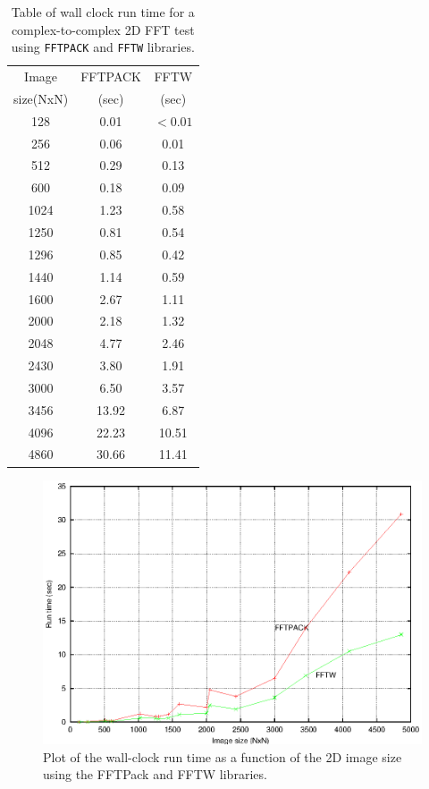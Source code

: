 \begin{table}[h!]
\begin{center}
\caption{\small Table of wall clock run time for a complex-to-complex 2D FFT
test using {\tt FFTPACK} and {\tt FFTW} libraries.}
\label{FFT_TAB}
\vskip 0.5cm
\begin{tabular}{|c|c|c|}
\hline
Image     & FFTPACK &  FFTW   \\
size(NxN) & (sec)   & (sec)   \\
\hline
128       & 0.01    & $<0.01$ \\
256       & 0.06    & 0.01    \\
512       & 0.29    & 0.13    \\
600       & 0.18    & 0.09    \\
1024      & 1.23    & 0.58    \\
1250      & 0.81    & 0.54    \\
1296      & 0.85    & 0.42    \\
1440      & 1.14    & 0.59    \\
1600      & 2.67    & 1.11    \\
2000      & 2.18    & 1.32    \\
2048      & 4.77    & 2.46    \\
2430      & 3.80    & 1.91    \\
3000      & 6.50    & 3.57    \\
3456      & 13.92   & 6.87    \\
4096      & 22.23   & 10.51   \\
4860      & 30.66   & 11.41   \\
\hline
\end{tabular}
\end{center}
\end{table}

\begin{figure}[h!]
\begin{center}
  \includegraphics[scale=0.9]{ffttime_langur.eps}
\caption[FFTPack vs FFTW performance for 2D FFTs]{\small Plot of the
wall-clock run time as a function of the 2D image size using the
FFTPack and FFTW libraries.}
\label{FFT_PLOT}
\end{center}
\end{figure}

